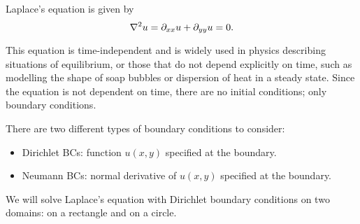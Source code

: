 Laplace's equation is given by
\begin{equation}
	\nabla^2u = \partial_{xx}u + \partial_{yy}u = 0.
\end{equation}

This equation is time-independent and is widely used in physics describing situations of equilibrium, or those that do not depend explicitly on time, such as modelling the shape of soap bubbles or dispersion of heat in a steady state. Since the equation is not dependent on time, there are no initial conditions; only boundary conditions.

There are two different types of boundary conditions to consider:
\begin{itemize}
	\item Dirichlet BCs: function $u(x,y)$ specified at the boundary.
	\item Neumann BCs: normal derivative of $u(x,y)$ specified at the boundary.
\end{itemize}

We will solve Laplace's equation with Dirichlet boundary conditions on two domains: on a rectangle and on a circle.

